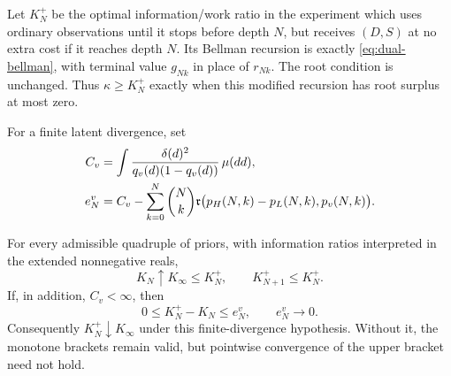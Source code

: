 Let $K_N^+$ be the optimal information/work ratio in the experiment which
uses ordinary observations until it stops before depth $N$, but receives
$(D,S)$ at no extra cost if it reaches depth $N$. Its Bellman recursion is
exactly \eqref{eq:dual-bellman}, with terminal value $g_{Nk}$ in place of
$r_{Nk}$. The root condition is unchanged. Thus $\kappa\ge K_N^+$ exactly
when this modified recursion has root surplus at most zero.

For a finite latent divergence, set
\begin{align}
 C_v&=\int\frac{\delta(d)^2}{q_v(d)(1-q_v(d))}\,\mu(dd),\notag\\
 e_N^v&=C_v-
 \sum_{k=0}^N\binom Nk
 \mathfrak r\bigl(p_H(N,k)-p_L(N,k),p_v(N,k)\bigr).
 \label{eq:genie-residual}
\end{align}

\begin{theorem}\label{thm:genie-ratio}
For every admissible quadruple of priors, with information ratios
interpreted in the extended nonnegative reals,
\begin{equation}\label{eq:genie-bracket}
 K_N\uparrow K_\infty\le K_N^+,
 \qquad K_{N+1}^+\le K_N^+.
\end{equation}
If, in addition, $C_v<\infty$, then
\begin{equation}\label{eq:genie-error}
 0\le K_N^+-K_N\le e_N^v,\qquad e_N^v\longrightarrow0.
\end{equation}
Consequently $K_N^+\downarrow K_\infty$ under this finite-divergence
hypothesis. Without it, the monotone brackets remain valid, but
pointwise convergence of the upper bracket need not hold.
\end{theorem}

